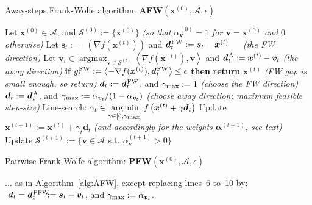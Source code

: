 \documentclass{article} %
\DeclareMathOperator*{\argmin}{\arg\min}
\DeclareMathOperator*{\argmax}{\arg\max}
\newcommand{\stepsize}{\gamma}
\newcommand{\stepmax}{\stepsize_{\textnormal{\scriptsize max}}} %
\newcommand{\FW}{{\hspace{0.05em}\textnormal{FW}}}
\newcommand{\PFW}{{\hspace{0.05em}\textnormal{PFW}}}
\newcommand{\away}{{\hspace{0.06em}\textnormal{\scriptsize A}}}
\newcommand{\x}{\bm{x}}
\newcommand{\s}{\bm{s}}
\newcommand{\dd}{\bm{d}}
\newcommand{\vv}{\bm{v}} %
\DeclareMathOperator*{\lmo}{LMO_{\!\Vertices}}
\newcommand{\Vertices}{\mathcal{A}} %
\newcommand{\Coreset}{\mathcal{S}}
\renewcommand{\aa}{\bm{\alpha}}
\newcommand{\0}{\mathbf{0}} %
\begin{document}
%
\begin{algorithm}
	\caption{Away-steps Frank-Wolfe algorithm: \textbf{AFW}$(\x^{(0)}, \Vertices, \epsilon)$}
	\label{alg:AFW}
	\begin{algorithmic}[1]
%
	\STATE Let $\x^{(0)} \in \Vertices$, and $\Coreset^{(0)} := \{\x^{(0)}\}$
	   \qquad \emph{\small(so that $\alpha^{(0)}_{\vv} = 1$ for $\vv=\x^{(0)}$ and $0$ otherwise)}
		\STATE Let $\s_t := \lmo \!\left(\nabla f(\x^{(t)})\right)$ %
		   and $\dd_t^\FW := \s_t - \x^{(t)}$ \qquad~~ \emph{\small(the FW direction)}
		\STATE Let $\vv_t \in \displaystyle\argmax_{\vv \in \Coreset^{(t)} } \textstyle\left\langle \nabla f(\x^{(t)}), \vv \right\rangle$ and $\dd_t^\away := \x^{(t)} - \vv_t$ \qquad \emph{\small(the away direction)}
		\STATE \textbf{if} $g_t^\FW  := \left\langle -\nabla f(\x^{(t)}), \dd_t^\FW\right\rangle  \leq \epsilon$ \textbf{then} \textbf{return} $\x^{(t)}$ \hspace{12mm}\emph{\small(FW gap is small enough, so return)}
		  \IF{$\left\langle -\nabla f(\x^{(t)}), \dd_t^\FW\right\rangle  \geq \left\langle -\nabla f(\x^{(t)}), \dd_t^\away\right\rangle$ }
		  \STATE $\dd_t :=  \dd_t^\FW$, and $\stepmax := 1$  
			     \hspace{22mm}\emph{\small(choose the FW direction)}
		  \ELSE
		  \STATE $\dd_t :=  \dd_t^\away$, and $\stepmax := \alpha_{\vv_t} / (1- \alpha_{\vv_t})$
		  	\hspace{5mm}\emph{\small(choose away direction; maximum feasible step-size)}
		  \ENDIF	
		  \STATE Line-search: $\stepsize_t \in \displaystyle\argmin_{\stepsize \in [0,\stepmax]} \textstyle f\left(\x^{(t)} + \stepsize \dd_t\right)$ 
		  \STATE Update $\x^{(t+1)} := \x^{(t)} + \stepsize_t \dd_t$  
		  	\hspace{2cm}\emph{\small(and accordingly for the weights $\aa^{(t+1)}$, see text)}
		  \STATE Update $\Coreset^{(t+1)} := \{\vv \in \Vertices \,\: \mathrm{ s.t. } \,\: \alpha^{(t+1)}_{\vv} > 0\}$
	\ENDFOR
	\end{algorithmic}
\end{algorithm}
\begin{algorithm}
	\caption{Pairwise Frank-Wolfe algorithm: \textbf{PFW}$(\x^{(0)}, \Vertices, \epsilon)$}
	\label{alg:PFW}
	\begin{algorithmic}[1]
	\STATE $\ldots$ as in Algorithm~\ref{alg:AFW}, except replacing lines~6 to~10 by:  $\,\, \dd_t = \dd^\PFW_t \!\!\!:= \s_t - \vv_t$, and $\stepmax := \alpha_{\vv_t}$.
	\end{algorithmic}
\end{algorithm}
\end{document}
